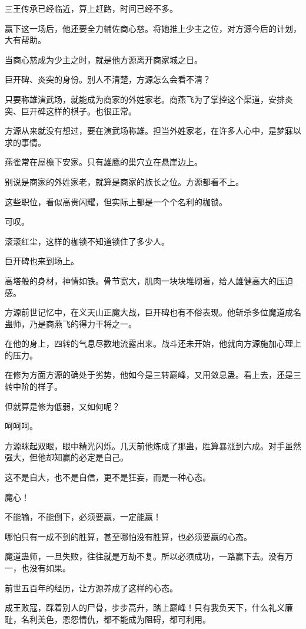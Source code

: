 \begin{this_body}
三王传承已经临近，算上赶路，时间已经不多。

赢下这一场后，他还要全力辅佐商心慈。将她推上少主之位，对方源今后的计划，大有帮助。

当商心慈成为少主之时，就是他方源离开商家城之日。

巨开碑、炎突的身份。别人不清楚，方源怎么会看不清？

只要称雄演武场，就能成为商家的外姓家老。商燕飞为了掌控这个渠道，安排炎突、巨开碑这样的棋子。也很正常。

方源从来就没有想过，要在演武场称雄。担当外姓家老，在许多人心中，是梦寐以求的事情。

燕雀常在屋檐下安家。只有雄鹰的巢穴立在悬崖边上。

别说是商家的外姓家老，就算是商家的族长之位。方源都看不上。

这些职位，看似高贵闪耀，但实际上都是一个个名利的枷锁。

可叹。

滚滚红尘，这样的枷锁不知道锁住了多少人。

巨开碑也来到场上。

高塔般的身材，神情如铁。骨节宽大，肌肉一块块堆砌着，给人雄健高大的压迫感。

方源前世记忆中，在义天山正魔大战，巨开碑也有不俗表现。他斩杀多位魔道成名蛊师，乃是商燕飞的得力干将之一。

在他的身上，四转的气息尽数地流露出来。战斗还未开始，他就向方源施加心理上的压力。

在修为方面方源的确处于劣势，他如今是三转巅峰，又用敛息蛊。看上去，还是三转中阶的样子。

但就算是修为低弱，又如何呢？

呵呵呵。

方源眯起双眼，眼中精光闪烁。几天前他炼成了那蛊，胜算暴涨到六成。对手虽然强大，但他却知赢的必定是自己。

这不是自大，也不是自信，更不是狂妄，而是一种心态。

魔心！

不能输，不能倒下，必须要赢，一定能赢！

哪怕只有一成不到的胜算，甚至哪怕没有胜算，也必须要赢的心态。

魔道蛊师，一旦失败，往往就是万劫不复。所以必须成功，一路赢下去。没有万一，也没有如果。

前世五百年的经历，让方源养成了这样的心态。

成王败寇，踩着别人的尸骨，步步高升，踏上巅峰！只有我负天下，什么礼义廉耻，名利美色，恩怨情仇，都不能成为阻碍，都可利用。


\end{this_body}
